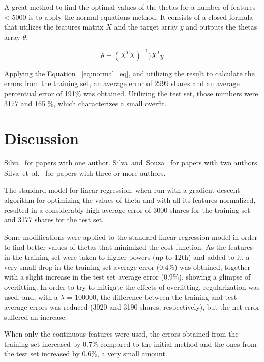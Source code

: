 \documentclass[10pt,twocolumn,letterpaper]{article}
\newcommand{\CITEONE}[2]{\mbox{#1 \cite{#2}}}
\newcommand{\CITETWO}[3]{\mbox{#1 and #2 \cite{#3}}}
\newcommand{\CITEN}[2]{\mbox{#1 et al. \cite{#2}}}
\begin{document}
A great method to find the optimal values of the thetas for a number of features < 5000 is to apply the normal equations method. It consists of a closed formula that utilizes the features matrix $X$ and the target array $y$ and outputs the thetas array $\theta$:

\begin{equation}\label{eq:normal_eq}
\theta = (X^{T}X)^{-1})X^{T}y
\end{equation}

Applying the Equation ~\ref{eq:normal_eq}, and utilizing the result to calculate the errors from the training set, an average error of 2999 shares and an average percentual error of 191$\%$ was obtained. Utilizing the test set, those numbers were 3177 and 165 $\%$, which characterizes a small overfit.

\section{Discussion}

\CITEONE{Silva}{Silva_2010} for papers with one author.
\CITETWO{Silva}{Souza}{Silva_2010b} for papers with two authors.
\CITEN{Silva}{Silva_2010c} for papers with three or more authors.

The standard model for linear regression, when run with a gradient descent algorithm for optimizing the values of theta and with all its features normalized, resulted in a considerably high average error of 3000 shares for the training set and 3177 shares for the test set.

Some modifications were applied to the standard linear regression model in order to find better values of thetas that minimized the cost function. As the features in the training set were taken to higher powers (up to 12th) and added to it, a very small drop in the training set average error (0.4$\%$) was obtained, together with a slight increase in the test set average error (0.9$\%$), showing a glimpse of overfitting. In order to try to mitigate the effects of overfitting, regularization was used, and, with a $\lambda$ = 100000, the difference between the training and test average errors was reduced (3020 and 3190 shares, respectively), but the net error suffered an increase.

When only the continuous features were used, the errors obtained from the training set increased by 0.7$\%$ compared to the initial method and the ones from the test set increased by 0.6$\%$, a very small amount.
\end{document}
